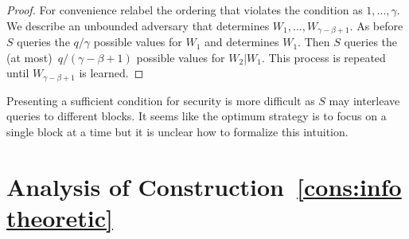 \documentclass[11pt]{article}
\newcommand{\consref}[1]{\mbox{Construction~\ref{#1}}}
\begin{document}
\begin{proof}
For convenience relabel the ordering that violates the condition as $1,..., \gamma$.  We describe an unbounded adversary that determines $W_1,..., W_{\gamma-\beta+1}$.  As before $S$ queries the $q /\gamma$ possible values for $W_1$ and determines $W_1$.  Then $S$ queries the (at most)~$q/(\gamma-\beta+1)$ possible values for $W_2 | W_1$.  This process is repeated until $W_{\gamma-\beta+1}$ is learned.  
\end{proof}

Presenting a sufficient condition for security is more difficult as $S$ may interleave queries to different blocks.  It seems like the optimum strategy is to focus on a single block at a time but it is unclear how to formalize this intuition.

\section{Analysis of \consref{cons:info theoretic}}
\label{sec:info theory sec}
\end{document}
